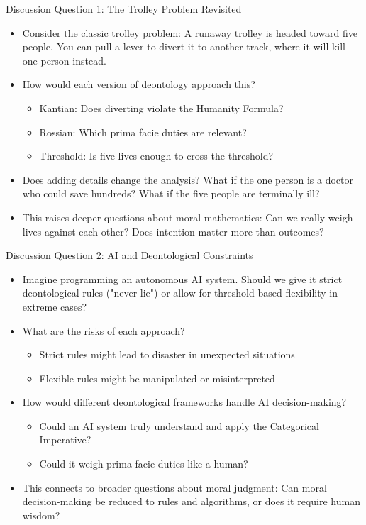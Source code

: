 \documentclass{beamer}
\begin{document}
\begin{frame}{Discussion Question 1: The Trolley Problem Revisited}
\begin{itemize}
    \item Consider the classic trolley problem: A runaway trolley is headed toward five people. You can pull a lever to divert it to another track, where it will kill one person instead.
    
    \item How would each version of deontology approach this?
    \begin{itemize}
        \item Kantian: Does diverting violate the Humanity Formula? 
        \item Rossian: Which prima facie duties are relevant?
        \item Threshold: Is five lives enough to cross the threshold?
    \end{itemize}
        
    \item Does adding details change the analysis? What if the one person is a doctor who could save hundreds? What if the five people are terminally ill?
    
    \item This raises deeper questions about moral mathematics: Can we really weigh lives against each other? Does intention matter more than outcomes?
\end{itemize}
\end{frame}

\begin{frame}{Discussion Question 2: AI and Deontological Constraints}
\begin{itemize}
    \item Imagine programming an autonomous AI system. Should we give it strict deontological rules ("never lie") or allow for threshold-based flexibility in extreme cases?
    
    \item What are the risks of each approach? 
    \begin{itemize}
        \item Strict rules might lead to disaster in unexpected situations
        \item Flexible rules might be manipulated or misinterpreted
    \end{itemize}
        
    \item How would different deontological frameworks handle AI decision-making?
    \begin{itemize}
        \item Could an AI system truly understand and apply the Categorical Imperative?
        \item Could it weigh prima facie duties like a human?
    \end{itemize}
        
    \item This connects to broader questions about moral judgment: Can moral decision-making be reduced to rules and algorithms, or does it require human wisdom?
\end{itemize}
\end{frame}
\end{document}
